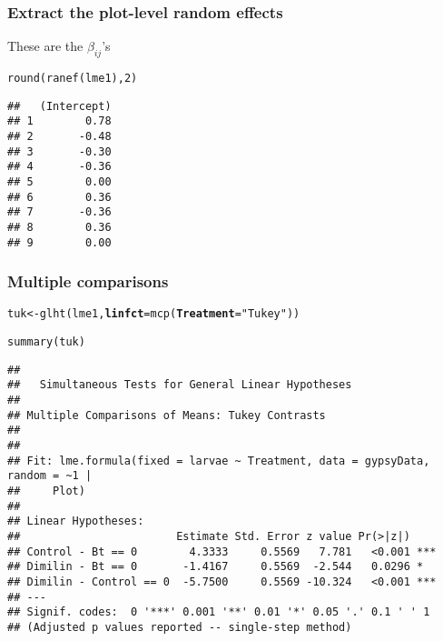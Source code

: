 \documentclass[color=usenames,dvipsnames]{beamer}\usepackage[]{graphicx}\usepackage[]{color}
\makeatletter
\newcommand{\hlnum}[1]{\textcolor[rgb]{0.69,0.494,0}{#1}}%
\newcommand{\hlstr}[1]{\textcolor[rgb]{0.749,0.012,0.012}{#1}}%
\newcommand{\hlstd}[1]{\textcolor[rgb]{0,0,0}{#1}}%
\newcommand{\hlkwb}[1]{\textcolor[rgb]{0,0.341,0.682}{#1}}%
\newcommand{\hlkwc}[1]{\textcolor[rgb]{0,0,0}{\textbf{#1}}}%
\newcommand{\hlkwd}[1]{\textcolor[rgb]{0.004,0.004,0.506}{#1}}%
\newenvironment{kframe}{%
 \def\at@end@of@kframe{}%
 \ifinner\ifhmode%
  \def\at@end@of@kframe{\end{minipage}}%
  \begin{minipage}{\columnwidth}%
 \fi\fi%
 \def\FrameCommand##1{\hskip\@totalleftmargin \hskip-\fboxsep
 \colorbox{shadecolor}{##1}\hskip-\fboxsep
     \hskip-\linewidth \hskip-\@totalleftmargin \hskip\columnwidth}%
 \MakeFramed {\advance\hsize-\width
   \@totalleftmargin\z@ \linewidth\hsize
   \@setminipage}}%
 {\par\unskip\endMakeFramed%
 \at@end@of@kframe}
\newenvironment{knitrout}{}{} %
\makeatother
\begin{document}
\begin{frame}[fragile]
  \frametitle{Extract the plot-level random effects}
  These are the $\beta_{ij}$'s
\begin{knitrout}
\color{fgcolor}\begin{kframe}
\begin{alltt}
\hlkwd{round}\hlstd{(}\hlkwd{ranef}\hlstd{(lme1),} \hlnum{2}\hlstd{)}
\end{alltt}
\begin{verbatim}
##   (Intercept)
## 1        0.78
## 2       -0.48
## 3       -0.30
## 4       -0.36
## 5        0.00
## 6        0.36
## 7       -0.36
## 8        0.36
## 9        0.00
\end{verbatim}
\end{kframe}
\end{knitrout}
\end{frame}



\begin{frame}[fragile]
  \frametitle{Multiple comparisons}
\begin{knitrout}\scriptsize
{}\color{fgcolor}\begin{kframe}
\begin{alltt}
\hlstd{tuk} \hlkwb{<-} \hlkwd{glht}\hlstd{(lme1,} \hlkwc{linfct}\hlstd{=}\hlkwd{mcp}\hlstd{(}\hlkwc{Treatment}\hlstd{=}\hlstr{"Tukey"}\hlstd{))}
\end{alltt}


{\ttfamily\noindent\bfseries{}}\end{kframe}
\end{knitrout}
\pause
\begin{knitrout}\scriptsize
{}\color{fgcolor}\begin{kframe}
\begin{alltt}
\hlkwd{summary}\hlstd{(tuk)}
\end{alltt}
\begin{verbatim}
## 
## 	 Simultaneous Tests for General Linear Hypotheses
## 
## Multiple Comparisons of Means: Tukey Contrasts
## 
## 
## Fit: lme.formula(fixed = larvae ~ Treatment, data = gypsyData, random = ~1 | 
##     Plot)
## 
## Linear Hypotheses:
##                        Estimate Std. Error z value Pr(>|z|)    
## Control - Bt == 0        4.3333     0.5569   7.781   <0.001 ***
## Dimilin - Bt == 0       -1.4167     0.5569  -2.544   0.0296 *  
## Dimilin - Control == 0  -5.7500     0.5569 -10.324   <0.001 ***
## ---
## Signif. codes:  0 '***' 0.001 '**' 0.01 '*' 0.05 '.' 0.1 ' ' 1
## (Adjusted p values reported -- single-step method)
\end{verbatim}
\end{kframe}
\end{knitrout}
\end{frame}
\end{document}
